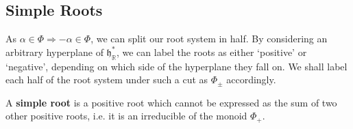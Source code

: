 \documentclass[11pt,fleqn]{article}
\begin{document}
\subsection{Simple Roots}

\begin{remark}
	As $\alpha \in \Phi \Rightarrow -\alpha \in \Phi$, we can split our root system in half. By considering an arbitrary hyperplane of $\mathfrak{h}^*_\mathbb{R}$, we can label the roots as either `positive' or `negative', depending on which side of the hyperplane they fall on. We shall label each half of the root system under such a cut as $\Phi_\pm$ accordingly.
\end{remark}

\begin{definition}
	A \textbf{simple root} is a positive root which cannot be expressed as the sum of two other positive roots, i.e. it is an irreducible of the monoid $\Phi_+$.
\end{definition}
\end{document}
